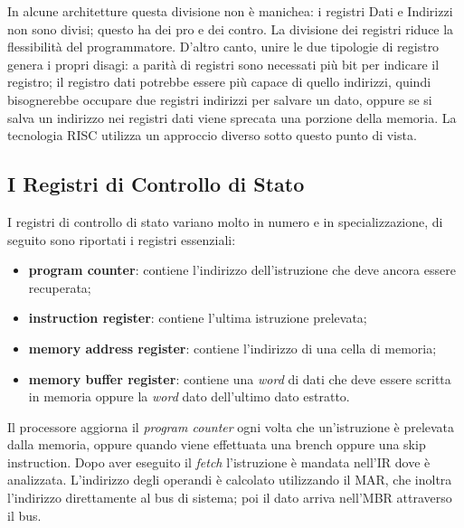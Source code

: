\documentclass{article}
\begin{document}
In alcune architetture questa divisione non è manichea: i registri Dati e Indirizzi non sono divisi; questo ha dei pro e dei contro. La divisione dei registri riduce la flessibilità del programmatore. D'altro canto, unire le due tipologie di registro genera i propri disagi: a parità di registri sono necessati più bit per indicare il registro; il registro dati potrebbe essere più capace di quello indirizzi, quindi bisognerebbe occupare due registri indirizzi per salvare un dato, oppure se si salva un indirizzo nei registri dati viene sprecata una porzione della memoria. La tecnologia RISC utilizza un approccio diverso sotto questo punto di vista.

\subsection{I Registri di Controllo di Stato}

I registri di controllo di stato variano molto in numero e in specializzazione, di seguito sono riportati i registri essenziali:
\begin{itemize}
	\item \textbf{program counter}: contiene l'indirizzo dell'istruzione che deve ancora essere recuperata;

	\item \textbf{instruction register}: contiene l'ultima istruzione prelevata;

	\item \textbf{memory address register}: contiene l'indirizzo di una cella di memoria;

	\item \textbf{memory buffer register}: contiene una \textit{word} di dati che deve essere scritta in memoria oppure la \textit{word} dato dell'ultimo dato estratto.
\end{itemize}

Il processore aggiorna il \textit{program counter} ogni volta che un'istruzione è prelevata dalla memoria, oppure quando viene effettuata una brench oppure una skip instruction.
Dopo aver eseguito il \textit{fetch} l'istruzione è mandata nell'IR dove è analizzata. L'indirizzo degli operandi è calcolato utilizzando il MAR, che inoltra l'indirizzo direttamente al bus di sistema; poi il dato arriva nell'MBR attraverso il bus.\\
\end{document}
